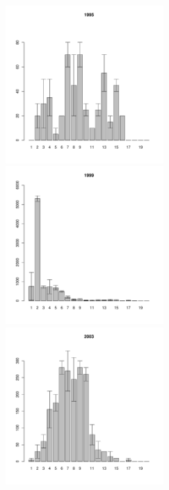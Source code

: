 \begin{figure}[ht]
\begin{multicols}{3}
\hfill
\includegraphics[width=60mm]{../White_Sea/Ryashkov_ZRS/zrs_1995_.pdf}
\hfill
\includegraphics[width=60mm]{../White_Sea/Ryashkov_ZRS/zrs_1999_.pdf}
\hfill
\includegraphics[width=60mm]{../White_Sea/Ryashkov_ZRS/zrs_2003_.pdf}
\end{multicols}



\end{figure}
